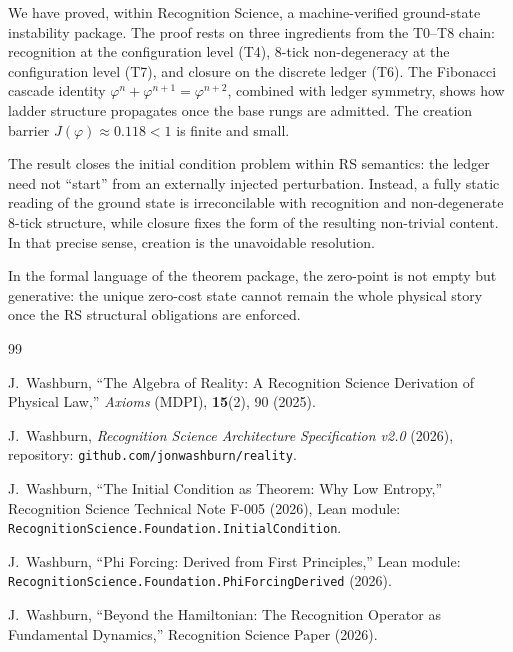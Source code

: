 \documentclass[11pt,a4paper]{article}
\newcommand{\Jcost}{J}
\newcommand{\phirs}{\varphi}
\begin{document}
We have proved, within Recognition Science, a machine-verified ground-state instability package.  The proof rests on three ingredients from the T0--T8 chain: recognition at the configuration level (T4), 8-tick non-degeneracy at the configuration level (T7), and closure on the discrete ledger (T6).  The Fibonacci cascade identity $\phirs^n+\phirs^{n+1}=\phirs^{n+2}$, combined with ledger symmetry, shows how ladder structure propagates once the base rungs are admitted.  The creation barrier $\Jcost(\phirs)\approx 0.118<1$ is finite and small.

The result closes the initial condition problem within RS semantics: the ledger need not ``start'' from an externally injected perturbation.  Instead, a fully static reading of the ground state is irreconcilable with recognition and non-degenerate 8-tick structure, while closure fixes the form of the resulting non-trivial content.  In that precise sense, creation is the unavoidable resolution.

In the formal language of the theorem package, the zero-point is not empty but generative: the unique zero-cost state cannot remain the whole physical story once the RS structural obligations are enforced.

\begin{thebibliography}{99}

J.~Washburn,
``The Algebra of Reality: A Recognition Science Derivation of Physical Law,''
\emph{Axioms} (MDPI), \textbf{15}(2), 90 (2025).

J.~Washburn,
\emph{Recognition Science Architecture Specification v2.0} (2026),
repository: \texttt{github.com/jonwashburn/reality}.

J.~Washburn,
``The Initial Condition as Theorem: Why Low Entropy,''
Recognition Science Technical Note F-005 (2026), Lean module: \texttt{RecognitionScience.Foundation.InitialCondition}.

J.~Washburn,
``Phi Forcing: Derived from First Principles,''
Lean module: \texttt{RecognitionScience.Foundation.PhiForcingDerived} (2026).

J.~Washburn,
``Beyond the Hamiltonian: The Recognition Operator as Fundamental Dynamics,''
Recognition Science Paper (2026).

\end{thebibliography}
\end{document}
